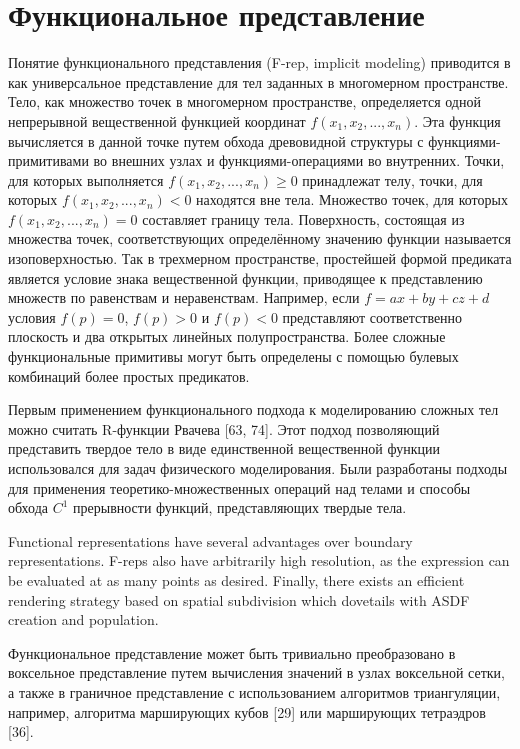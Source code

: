 \section{Функциональное представление} \label{sect_implicit}

Понятие функционального представления (F-rep, implicit modeling) приводится в  как универсальное представление для тел заданных в многомерном пространстве. Тело, как множество точек в многомерном пространстве, определяется одной непрерывной вещественной функцией координат $f(x_{1},x_{2},...,x_{n})$. Эта функция вычисляется в данной точке путем обхода древовидной структуры с функциями-примитивами во внешних узлах и функциями-операциями во внутренних. Точки, для которых выполняется $f(x_{1},x_{2},...,x_{n})\geq 0$ принадлежат телу, точки, для которых $ f(x_{1},x_{2},...,x_{n})<0$ находятся вне тела. Множество точек, для которых $f(x_{1},x_{2},...,x_{n})=0$ составляет границу тела. Поверхность, состоящая из множества точек, соответствующих определённому значению функции называется изоповерхностью. Так в трехмерном пространстве, простейшей формой предиката является условие знака вещественной функции, приводящее к представлению множеств по равенствам и неравенствам. Например, если $ f = ax + by + cz + d$  условия $f (p) = 0$, $f (p)> 0$ и $f (p) <0$ представляют соответственно плоскость и два открытых линейных полупространства. Более сложные функциональные примитивы могут быть определены с помощью булевых комбинаций более простых предикатов.

Первым применением функционального подхода к моделированию сложных тел можно считать R-функции Рвачева [63, 74]. Этот подход позволяющий представить твердое тело в виде единственной вещественной функции использовался для задач физического моделирования. Были разработаны подходы для применения теоретико-множественных операций над телами и способы обхода $C^1$ прерывности функций, представляющих твердые тела.

Functional representations have several advantages over boundary representations.
F-reps also have arbitrarily high resolution, as the expression can be evaluated at as many
points as desired. Finally, there exists an efficient rendering strategy based on spatial
subdivision which dovetails with ASDF creation and population.

Функциональное представление может быть тривиально преобразовано в воксельное представление путем вычисления значений в узлах воксельной сетки, а также в граничное представление с использованием алгоритмов триангуляции, например, алгоритма марширующих кубов [29] или марширующих тетраэдров [36].

